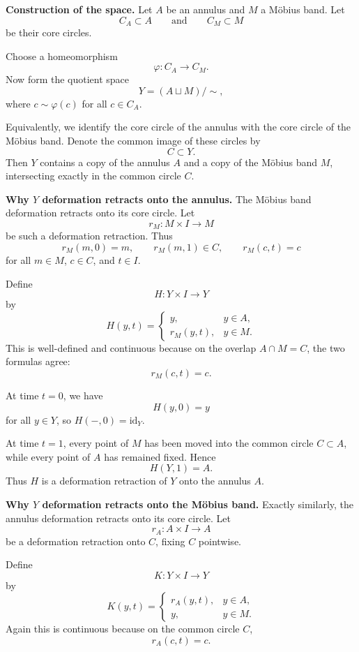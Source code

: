 \documentclass[12pt,a4paper]{article}
\theoremstyle{notespace}
\begin{document}
\medskip

\textbf{Construction of the space.}
Let \(A\) be an annulus and \(M\) a Möbius band. Let
\[
C_A\subset A
\qquad\text{and}\qquad
C_M\subset M
\]
be their core circles.

Choose a homeomorphism
\[
\varphi:C_A\to C_M.
\]
Now form the quotient space
\[
Y=(A\sqcup M)/\sim,
\]
where \(c\sim \varphi(c)\) for all \(c\in C_A\).

Equivalently, we identify the core circle of the annulus with the core circle of the Möbius band. Denote the common image of these circles by
\[
C\subset Y.
\]
Then \(Y\) contains a copy of the annulus \(A\) and a copy of the Möbius band \(M\), intersecting exactly in the common circle \(C\).

\medskip

\textbf{Why \(Y\) deformation retracts onto the annulus.}
The Möbius band deformation retracts onto its core circle. Let
\[
r_M:M\times I\to M
\]
be such a deformation retraction. Thus
\[
r_M(m,0)=m,
\qquad
r_M(m,1)\in C,
\qquad
r_M(c,t)=c
\]
for all \(m\in M\), \(c\in C\), and \(t\in I\).

Define
\[
H:Y\times I\to Y
\]
by
\[
H(y,t)=
\begin{cases}
	y,& y\in A,\\[4pt]
	r_M(y,t),& y\in M.
\end{cases}
\]
This is well-defined and continuous because on the overlap \(A\cap M=C\), the two formulas agree:
\[
r_M(c,t)=c.
\]

At time \(t=0\), we have
\[
H(y,0)=y
\]
for all \(y\in Y\), so \(H(-,0)=\mathrm{id}_Y\).

At time \(t=1\), every point of \(M\) has been moved into the common circle \(C\subset A\), while every point of \(A\) has remained fixed. Hence
\[
H(Y,1)=A.
\]
Thus \(H\) is a deformation retraction of \(Y\) onto the annulus \(A\).

\medskip

\textbf{Why \(Y\) deformation retracts onto the Möbius band.}
Exactly similarly, the annulus deformation retracts onto its core circle. Let
\[
r_A:A\times I\to A
\]
be a deformation retraction onto \(C\), fixing \(C\) pointwise.

Define
\[
K:Y\times I\to Y
\]
by
\[
K(y,t)=
\begin{cases}
	r_A(y,t),& y\in A,\\[4pt]
	y,& y\in M.
\end{cases}
\]
Again this is continuous because on the common circle \(C\),
\[
r_A(c,t)=c.
\]
\end{document}
